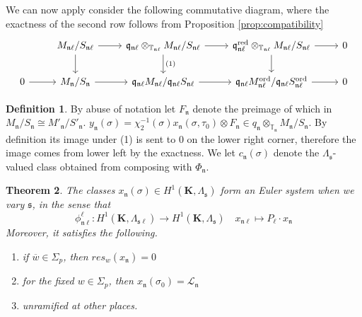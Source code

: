 \documentclass[leqno]{amsart}
\newcommand{\TT}{\mathbb{T}} %
\newcommand{\bw}{\overline{w}}
\newcommand{\red}{\textnormal{red}}
\newcommand{\ord}{\textnormal{ord}}
\newcommand{\K}{{\mathbf{K}}} %
\newcommand{\fs}{\mathfrak{s}}
\newcommand{\fn}{\mathfrak{n}}
\newcommand{\fq}{\mathfrak{q}}
\newtheorem{thm}{Theorem}[section]
\theoremstyle{definition}
\newtheorem{defn}[thm]{Definition}
\theoremstyle{remark}
\begin{document}
We can now apply consider the following 
commutative diagram,
where the exactness of the second row
follows from
Proposition \ref{prop:compatibility}
\[
\begin{tikzcd}
&M_{\fn\ell}/S_{\fn\ell}\arrow[r]\arrow[d]&
\fq_{\fn\ell}\otimes_{\TT_{\fn\ell}}
	M_{\fn\ell}/S_{\fn\ell}\arrow[r]\arrow[d,"(1)"]&
\fq_{\fn\ell}^{\red}\otimes_{\TT_{\fn\ell}}
	M_{\fn\ell}/S_{\fn\ell}\arrow[r]\arrow[d]&0\\
0\arrow[r]&
M_\fn/S_\fn \arrow[r]&
\fq_{\fn\ell}M_{\fn\ell}/\fq_{\fn\ell}S_{\fn\ell} \arrow[r]&
\fq_{\fn\ell}M^{\ord}_{\fn\ell}/
\fq_{\fn\ell}S^{\ord}_{\fn\ell} \arrow[r] &0
\end{tikzcd}
\]

\begin{defn}
	By abuse of notation
	let $F_\fn$
	denote the preimage of which in
	$M_{\fn}/S_{\fn}\cong M'_\fn/S'_\fn$.
	$y_\fn(\sigma)=\chi_2^{-1}(\sigma)
	x_{\fn}(\sigma,\tau_0)\otimes
	F_{\fn}\in 
	q_{\fn}\otimes_{\TT_{\fn}}M_{\fn}/S_{\fn}$.
	By definition
	its image under (1) is sent to $0$
	on the lower right corner,
	therefore the image
	comes from lower left 
	by the exactness.
	We let  $c_{\fn}(\sigma)$
	denote the $\Lambda_{\fs}$-valued
	class obtained from composing
	with $\Phi_\fn$.
\end{defn}

\begin{thm}
	The classes $x_{\fn}(\sigma)\in 
	H^1(\K, \Lambda_{\fs})$
	form an Euler system when we vary $\fs$,
	in the sense that 
	\[
		\phi_{\fn\ell}^{\ell}\colon
		H^1(\K,\Lambda_{\fs\ell})\to 
		H^1(\K,\Lambda_{\fs})\quad
		x_{\fn\ell}\mapsto
		P_\ell\cdot x_\fn
	\]
	Moreover, it satisfies the following.
	\begin{enumerate}[label=(\alph*)]
	\item if $\bw\in \Sigma_p$,
		then  $res_w(x_\fn)=0$
	\item for the fixed  $w\in \Sigma_p$,
		then  $x_\fn(\sigma_0)=\mathcal{L}_\fn$
	\item unramified at other places.
	\end{enumerate}
\end{thm}
\end{document}
